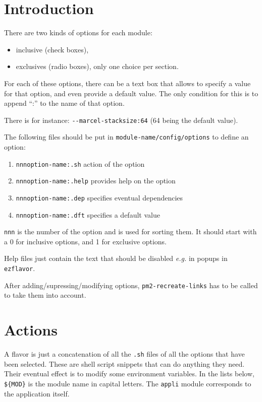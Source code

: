 \documentclass[11pt, a4paper ,twoside]{article}
\begin{document}
\section{Introduction}

There are two kinds of options for each module:
\begin{itemize}
\item inclusive (check boxes),
\item exclusives (radio boxes), only one choice per section.
\end{itemize}

For each of these options, there can be a text box that allows to
specify a value for that option, and even provide a default value.
The only condition for this is to append ``:'' to the name of that
option.

There is for instance: \verb|--marcel-stacksize:64| (64 being the
default value).

The following files should be put in \verb|module-name/config/options| to
define an option:
\begin{enumerate}
\item \verb|nnnoption-name:.sh| action of the option
\item \verb|nnnoption-name:.help| provides help on the option
\item \verb|nnnoption-name:.dep| specifies eventual dependencies
\item \verb|nnnoption-name:.dft| specifies a default value
\end{enumerate}

\verb+nnn+ is the number of the option and is used for sorting them. It
should start with a 0 for inclusive options, and 1 for exclusive
options.

Help files just contain the text that should be disabled \emph{e.g.} in
popups in \verb+ezflavor+.

After adding/supressing/modifying options, \verb+pm2-recreate-links+ has
to be called to take them into account.

\section{Actions}

A flavor is just a concatenation of all the \verb+.sh+ files of all the
options that have been selected.  These are shell script snippets that
can do anything they need.  Their eventual effect is to modify some
environment variables.  In the lists below, \verb+${MOD}+ is the module
name in capital letters.  The \verb+appli+ module corresponds to 
the application itself.
\end{document}
